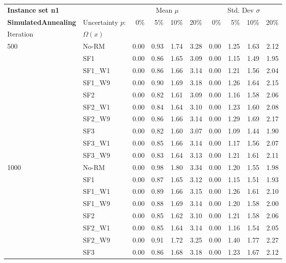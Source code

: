 \newpage

{\fontsize{10}{11} \selectfont
\begin{longtable}{ll|rrrr|rrrr}
\toprule
\textbf{Instance set n1}                 & {} & \multicolumn{4}{c|}{Mean $\mu$} & \multicolumn{4}{c}{Std. Dev $\sigma$} \\
\textbf{SimulatedAnnealing}                 & Uncertainty $p$: & 0\% & 5\% & 10\% & 20\% & 0\% & 5\% & 10\% & 20\% \\
Iteration & $\Omega(x)$ &      &      &      &      &      &      &      &      \\
\midrule
500  & No-RM & 0.00 & 0.93 & 1.74 & 3.28 & 0.00 & 1.25 & 1.63 & 2.12 \\
     & SF1 & 0.00 & 0.86 & 1.65 & 3.09 & 0.00 & 1.15 & 1.49 & 1.95 \\
     & SF1\_W1 & 0.00 & 0.86 & 1.66 & 3.14 & 0.00 & 1.21 & 1.56 & 2.04 \\
     & SF1\_W9 & 0.00 & 0.90 & 1.69 & 3.18 & 0.00 & 1.26 & 1.64 & 2.15 \\
     & SF2 & 0.00 & 0.82 & 1.61 & 3.09 & 0.00 & 1.16 & 1.58 & 2.06 \\
     & SF2\_W1 & 0.00 & 0.84 & 1.64 & 3.10 & 0.00 & 1.23 & 1.60 & 2.08 \\
     & SF2\_W9 & 0.00 & 0.86 & 1.66 & 3.14 & 0.00 & 1.29 & 1.69 & 2.17 \\
     & SF3 & 0.00 & 0.82 & 1.60 & 3.07 & 0.00 & 1.09 & 1.44 & 1.90 \\
     & SF3\_W1 & 0.00 & 0.85 & 1.66 & 3.14 & 0.00 & 1.17 & 1.56 & 2.07 \\
     & SF3\_W9 & 0.00 & 0.83 & 1.64 & 3.13 & 0.00 & 1.21 & 1.61 & 2.11 \\ \hline
1000 & No-RM & 0.00 & 0.98 & 1.80 & 3.34 & 0.00 & 1.20 & 1.55 & 1.98 \\
     & SF1 & 0.00 & 0.87 & 1.65 & 3.12 & 0.00 & 1.15 & 1.51 & 1.93 \\
     & SF1\_W1 & 0.00 & 0.89 & 1.66 & 3.15 & 0.00 & 1.26 & 1.61 & 2.10 \\
     & SF1\_W9 & 0.00 & 0.88 & 1.69 & 3.14 & 0.00 & 1.20 & 1.58 & 2.00 \\
     & SF2 & 0.00 & 0.85 & 1.62 & 3.10 & 0.00 & 1.21 & 1.58 & 2.06 \\
     & SF2\_W1 & 0.00 & 0.85 & 1.64 & 3.14 & 0.00 & 1.16 & 1.54 & 2.05 \\
     & SF2\_W9 & 0.00 & 0.91 & 1.72 & 3.25 & 0.00 & 1.40 & 1.77 & 2.27 \\
     & SF3 & 0.00 & 0.86 & 1.68 & 3.18 & 0.00 & 1.23 & 1.67 & 2.12 \\

\end{longtable}}
